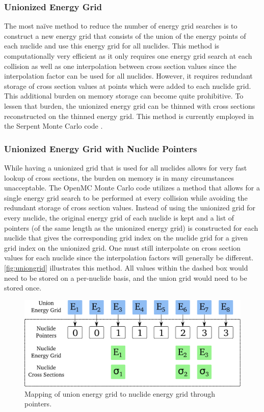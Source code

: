 \subsubsection{Unionized Energy Grid}

The most naïve method to reduce the number of energy grid searches is to
construct a new energy grid that consists of the union of the energy points of
each nuclide and use this energy grid for all nuclides. This method is
computationally very efficient as it only requires one energy grid search at
each collision as well as one interpolation between cross section values since
the interpolation factor can be used for all nuclides. However, it requires
redundant storage of cross section values at points which were added to each
nuclide grid. This additional burden on memory storage can become quite
prohibitive. To lessen that burden, the unionized energy grid can be thinned
with cross sections reconstructed on the thinned energy grid. This method is
currently employed in the Serpent Monte Carlo code \cite{vtt-leppanen-2007}.

\subsubsection{Unionized Energy Grid with Nuclide Pointers}

While having a unionized grid that is used for all nuclides allows for very fast
lookup of cross sections, the burden on memory is in many circumstances
unacceptable. The OpenMC Monte Carlo code utilizes a method that allows for a
single energy grid search to be performed at every collision while avoiding the
redundant storage of cross section values. Instead of using the unionized grid
for every nuclide, the original energy grid of each nuclide is kept and a list
of pointers (of the same length as the unionized energy grid) is constructed for
each nuclide that gives the corresponding grid index on the nuclide grid for a
given grid index on the unionized grid. One must still interpolate on cross
section values for each nuclide since the interpolation factors will generally
be different. \autoref{fig:uniongrid} illustrates this method. All values within
the dashed box would need to be stored on a per-nuclide basis, and the union
grid would need to be stored once.
\begin{figure}[htb]
  \centering
  \includegraphics[width=6.0in]{figures/ch2/uniongrid.pdf}
  \caption{Mapping of union energy grid to nuclide energy grid through
    pointers.}
  \label{fig:uniongrid}
\end{figure}

